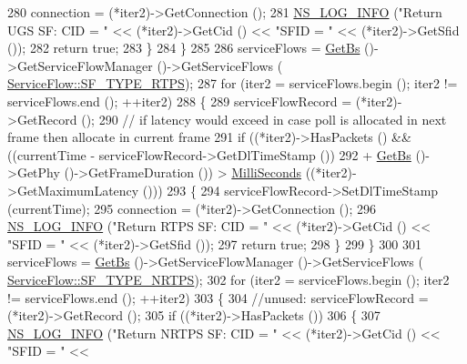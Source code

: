 \begin{DoxyCode}
280               connection = (*iter2)->GetConnection ();
281               \hyperlink{group__logging_gafbd73ee2cf9f26b319f49086d8e860fb}{NS\_LOG\_INFO} (\textcolor{stringliteral}{"Return UGS SF: CID = "} << (*iter2)->GetCid () << \textcolor{stringliteral}{"SFID = "} << 
      (*iter2)->GetSfid ());
282               \textcolor{keywordflow}{return} \textcolor{keyword}{true};
283             \}
284         \}
285 
286       serviceFlows = \hyperlink{classns3_1_1BSScheduler_a8b09065ac8f74cb35446af55128e41c7}{GetBs} ()->GetServiceFlowManager ()->GetServiceFlows (
      \hyperlink{classns3_1_1ServiceFlow_a7990ba10be1e098328fd1e6382a26235a0e98ff713b932a029acad7e5b24bbf55}{ServiceFlow::SF\_TYPE\_RTPS});
287       \textcolor{keywordflow}{for} (iter2 = serviceFlows.begin (); iter2 != serviceFlows.end (); ++iter2)
288         \{
289           serviceFlowRecord = (*iter2)->GetRecord ();
290           \textcolor{comment}{// if latency would exceed in case poll is allocated in next frame then allocate in current frame}
291           \textcolor{keywordflow}{if} ((*iter2)->HasPackets () && ((currentTime - serviceFlowRecord->GetDlTimeStamp ())
292                                           + \hyperlink{classns3_1_1BSScheduler_a8b09065ac8f74cb35446af55128e41c7}{GetBs} ()->GetPhy ()->GetFrameDuration ()) > 
      \hyperlink{group__timecivil_gaf26127cf4571146b83a92ee18679c7a9}{MilliSeconds} ((*iter2)->GetMaximumLatency ()))
293             \{
294               serviceFlowRecord->SetDlTimeStamp (currentTime);
295               connection = (*iter2)->GetConnection ();
296               \hyperlink{group__logging_gafbd73ee2cf9f26b319f49086d8e860fb}{NS\_LOG\_INFO} (\textcolor{stringliteral}{"Return RTPS SF: CID = "} << (*iter2)->GetCid () << \textcolor{stringliteral}{"SFID = "} << 
      (*iter2)->GetSfid ());
297               \textcolor{keywordflow}{return} \textcolor{keyword}{true};
298             \}
299         \}
300 
301       serviceFlows = \hyperlink{classns3_1_1BSScheduler_a8b09065ac8f74cb35446af55128e41c7}{GetBs} ()->GetServiceFlowManager ()->GetServiceFlows (
      \hyperlink{classns3_1_1ServiceFlow_a7990ba10be1e098328fd1e6382a26235a7f8577f851a9f01d159442a3a3fcdf48}{ServiceFlow::SF\_TYPE\_NRTPS});
302       \textcolor{keywordflow}{for} (iter2 = serviceFlows.begin (); iter2 != serviceFlows.end (); ++iter2)
303         \{
304           \textcolor{comment}{//unused: serviceFlowRecord = (*iter2)->GetRecord ();}
305           \textcolor{keywordflow}{if} ((*iter2)->HasPackets ())
306             \{
307               \hyperlink{group__logging_gafbd73ee2cf9f26b319f49086d8e860fb}{NS\_LOG\_INFO} (\textcolor{stringliteral}{"Return NRTPS SF: CID = "} << (*iter2)->GetCid () << \textcolor{stringliteral}{"SFID = "} << 

\end{DoxyCode}
